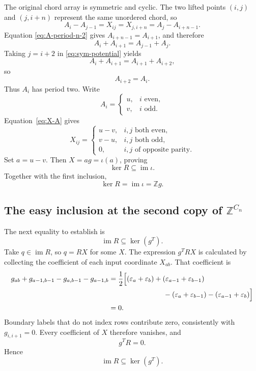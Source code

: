 \documentclass[11pt]{article}
\theoremstyle{definition}
\newcommand{\Z}{\mathbb Z}
\newcommand{\im}{\operatorname{im}}
\begin{document}
The original chord array is symmetric and cyclic.  The two lifted points
$(i,j)$ and $(j,i+n)$ represent the same unordered chord, so
\[
 A_i-A_{j-1}=X_{ij}=X_{j,i+n}=A_j-A_{i+n-1}.
\]
Equation \eqref{eq:A-period-n-2} gives $A_{i+n-1}=A_{i+1}$, and therefore
\begin{equation}\label{eq:sym-potential}
 A_i+A_{i+1}=A_{j-1}+A_j.
\end{equation}
Taking $j=i+2$ in \eqref{eq:sym-potential} yields
\[
 A_i+A_{i+1}=A_{i+1}+A_{i+2},
\]
so
\[
 A_{i+2}=A_i.
\]
Thus $A_i$ has period two.  Write
\[
 A_i=
 \begin{cases}
 u,&i\text{ even},\\
 v,&i\text{ odd}.
 \end{cases}
\]
Equation~\eqref{eq:X-A} gives
\[
 X_{ij}=
 \begin{cases}
 u-v,&i,j\text{ both even},\\
 v-u,&i,j\text{ both odd},\\
 0,&i,j\text{ of opposite parity}.
 \end{cases}
\]
Set $a=u-v$.  Then $X=ag=\iota(a)$, proving
\[
 \ker R\subseteq\im\iota.
\]
Together with the first inclusion,
\begin{equation}\label{eq:kerR}
 \boxed{\ker R=\im\iota=\Z g.}
\end{equation}

\subsection{The easy inclusion at the second copy of \texorpdfstring{$\Z^{C_n}$}{Z(Cn)}}

The next equality to establish is
\[
 \im R\subseteq\ker(g^T).
\]
Take $q\in\im R$, so $q=RX$ for some $X$.  The expression $g^TRX$ is calculated by
collecting the coefficient of each input coordinate $X_{ab}$.  That
coefficient is
\begin{align*}
g_{ab}+g_{a-1,b-1}-g_{a,b-1}-g_{a-1,b}
&=\frac12\Bigl[(\varepsilon_a+\varepsilon_b)
 +(\varepsilon_{a-1}+\varepsilon_{b-1})\\
&\hspace{2.7cm}-(\varepsilon_a+\varepsilon_{b-1})
 -(\varepsilon_{a-1}+\varepsilon_b)\Bigr]\\
&=0.
\end{align*}
Boundary labels that do not index rows contribute zero, consistently with
$g_{i,i+1}=0$.  Every coefficient of $X$ therefore vanishes, and
\begin{equation}\label{eq:gTR}
 g^TR=0.
\end{equation}
Hence
\begin{equation}\label{eq:easy-image}
 \boxed{\im R\subseteq\ker(g^T).}
\end{equation}
\end{document}
